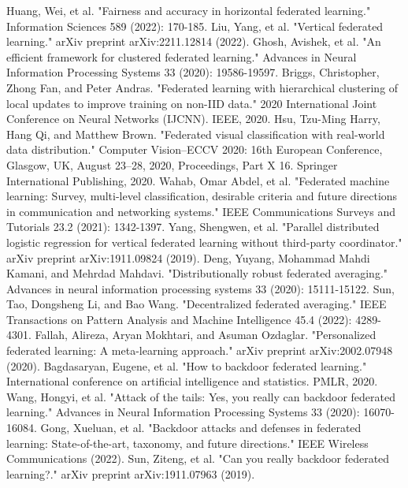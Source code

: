 \documentclass[conference]{IEEEtran}
\begin{document}
\begin{thebibliography}{00}
     Huang, Wei, et al. "Fairness and accuracy in horizontal federated learning." Information Sciences 589 (2022): 170-185.
     Liu, Yang, et al. "Vertical federated learning." arXiv preprint arXiv:2211.12814 (2022).
     Ghosh, Avishek, et al. "An efficient framework for clustered federated learning." Advances in Neural Information Processing Systems 33 (2020): 19586-19597.
     Briggs, Christopher, Zhong Fan, and Peter Andras. "Federated learning with hierarchical clustering of local updates to improve training on non-IID data." 2020 International Joint Conference on Neural Networks (IJCNN). IEEE, 2020.
     Hsu, Tzu-Ming Harry, Hang Qi, and Matthew Brown. "Federated visual classification with real-world data distribution." Computer Vision–ECCV 2020: 16th European Conference, Glasgow, UK, August 23–28, 2020, Proceedings, Part X 16. Springer International Publishing, 2020.
     Wahab, Omar Abdel, et al. "Federated machine learning: Survey, multi-level classification, desirable criteria and future directions in communication and networking systems." IEEE Communications Surveys and Tutorials 23.2 (2021): 1342-1397.
     Yang, Shengwen, et al. "Parallel distributed logistic regression for vertical federated learning without third-party coordinator." arXiv preprint arXiv:1911.09824 (2019).
     Deng, Yuyang, Mohammad Mahdi Kamani, and Mehrdad Mahdavi. "Distributionally robust federated averaging." Advances in neural information processing systems 33 (2020): 15111-15122.
     Sun, Tao, Dongsheng Li, and Bao Wang. "Decentralized federated averaging." IEEE Transactions on Pattern Analysis and Machine Intelligence 45.4 (2022): 4289-4301.
     Fallah, Alireza, Aryan Mokhtari, and Asuman Ozdaglar. "Personalized federated learning: A meta-learning approach." arXiv preprint arXiv:2002.07948 (2020).
     Bagdasaryan, Eugene, et al. "How to backdoor federated learning." International conference on artificial intelligence and statistics. PMLR, 2020.
     Wang, Hongyi, et al. "Attack of the tails: Yes, you really can backdoor federated learning." Advances in Neural Information Processing Systems 33 (2020): 16070-16084.
     Gong, Xueluan, et al. "Backdoor attacks and defenses in federated learning: State-of-the-art, taxonomy, and future directions." IEEE Wireless Communications (2022).
     Sun, Ziteng, et al. "Can you really backdoor federated learning?." arXiv preprint arXiv:1911.07963 (2019).

\end{thebibliography}
\end{document}

